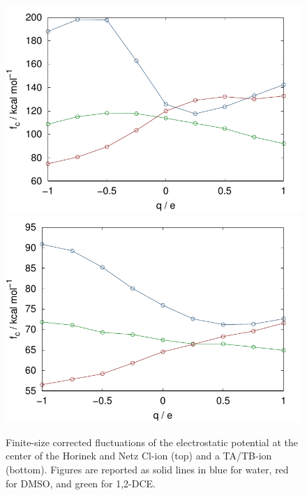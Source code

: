 \begin{tatb}
\begin{figure} 
 \includegraphics[width=0.80\linewidth]{images/tatb/cl_sized_fq_var.pdf} \\
 \includegraphics[width=0.80\linewidth]{images/tatb/tatb_sized_fq_var.pdf} 
 \caption[Corrected fluctuations of the electrostatic potential at the center of an uncharged cavity]{\label{fig:fq_flucts}Finite-size corrected fluctuations of
 the electrostatic potential at the center of the Horinek and Netz Cl\sur{-}-ion (top) and a TA\sur{+}/TB\sur{-}-ion (bottom). Figures are reported as solid lines 
 in blue for water, red for DMSO, and green for 1,2-DCE.}
\end{figure}


\end{tatb}
